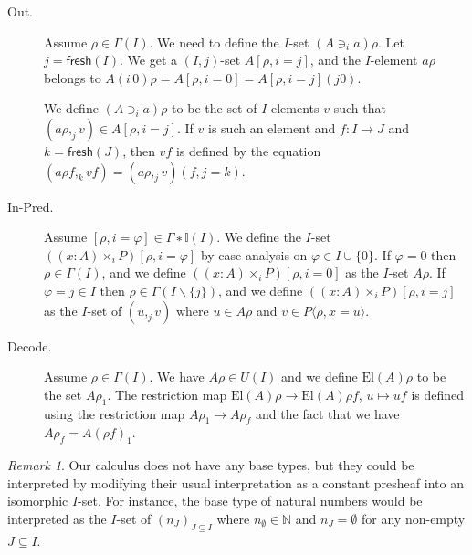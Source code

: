 \documentclass[english]{PaperTools/latex/entcs}
\theoremstyle{plain}
\theoremstyle{definition}
\theoremstyle{remark}
\newtheorem*{remark}{Remark}
\newcommand\CTimes[2]{(#2) ×_{#1}}
\newcommand\op[1]{∋_{#1}}
\def\fresh#1{\mathsf{fresh}(#1)}
\def\El#1{\mathrm{El}(#1)}
\begin{document}
\begin{description}
  \item[\sc Out.]
    Assume $ρ ∈ Γ(I)$. We need to define the $I$-set $(A \op {i} a)ρ$.
    Let $j = \fresh I$.  We get a $(I,j)$-set $A[ρ,i=j]$,
    and the $I$-element $aρ$ belongs to
    $A(i\,0)ρ = A[ρ,i=0] = A[ρ,i=j](j 0)$.

    We define $(A \op {i} a)ρ$ to be the set of $I$-elements $v$ such that
    $(aρ,_j v) ∈ A[ρ,i=j]$.
    If $v$ is such an element and $f : I → J$ and $k=\fresh J$, then
    $vf$ is defined by the equation $(aρf,_k vf) = (aρ ,_j v)(f, j=k)$.


  \item[\sc In-Pred.]
    Assume $[ρ,i=φ] ∈ Γ∗𝕀(I)$.  We define the $I$-set $(\CTimes i {x:A} P)[ρ,i=φ]$
    by case analysis on $φ ∈ I∪\{0\}$.
    If $φ = 0$ then $ρ ∈ Γ(I)$, and we define $(\CTimes i {x:A} P)[ρ,i=0]$ as
    the $I$-set $Aρ$.
    If $φ = j ∈ I$ then $ρ ∈ Γ(I\backslash\{j\})$, and we define
    $(\CTimes i {x:A} P)[ρ,i=j]$ as the $I$-set of $(u ,_j v)$ where
    $u ∈ Aρ$ and $v ∈ P⟨ρ,x=u⟩$.


  \item[\sc Decode.]
    Assume $ρ ∈ Γ(I)$.  We have $Aρ ∈ U(I)$ and we define
    $\El{A}ρ$ to be the set $Aρ_1$.
    The restriction map $\El{A}ρ → \El{A}ρf$, $u ↦ uf$ is defined
    using the restriction map $Aρ_1 → Aρ_f$ and the fact that we have
    $Aρ_f = A(ρf)_1$.
\end{description}

\begin{remark}
  Our calculus does not have any base types, but they could be interpreted
  by modifying their usual interpretation as a constant presheaf into an
  isomorphic $I$-set.
  For instance, the base type of natural numbers would be interpreted as
  the $I$-set of $(n_J)_{J ⊆ I}$ where $n_∅ ∈ ℕ$ and $n_J = ∅$ for any
  non-empty $J ⊆ I$.
\end{remark}
\end{document}
